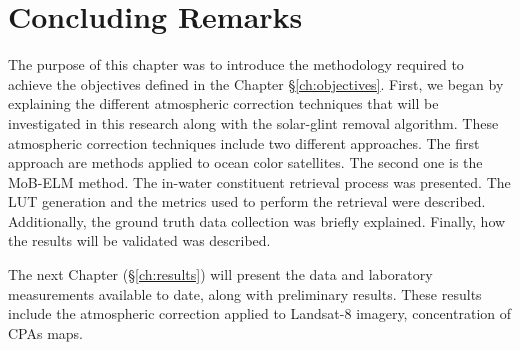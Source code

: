 




\section{Concluding Remarks}
The purpose of this chapter was to introduce the methodology required to achieve the objectives defined in the Chapter \S\ref{ch:objectives}. First, we began by explaining the different atmospheric correction techniques that will be investigated in this research along with the solar-glint removal algorithm. These atmospheric correction techniques include two different approaches. The first approach are methods applied to ocean color satellites. The second one is the MoB-ELM method. The in-water constituent retrieval process was presented. The LUT generation and the metrics used to perform the retrieval were described. Additionally, the ground truth data collection was briefly explained. Finally, how the results will be validated was described. 

The next Chapter (\S\ref{ch:results}) will present the data and laboratory measurements available to date, along with preliminary results. These results include the atmospheric correction applied to Landsat-8 imagery, concentration of CPAs maps.


